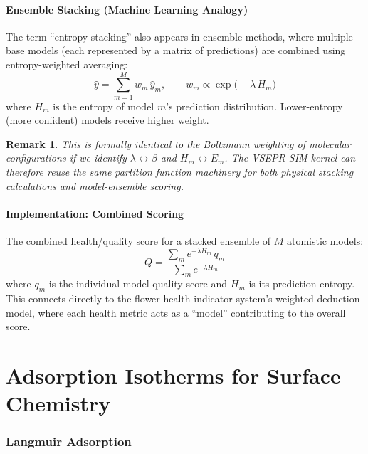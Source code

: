 \documentclass[11pt]{article}
\newtheorem{remark}{Remark}[section]
\begin{document}
\subsection{Ensemble Stacking (Machine Learning Analogy)}

The term ``entropy stacking'' also appears in ensemble methods, where
multiple base models (each represented by a matrix of predictions) are
combined using entropy-weighted averaging:
\begin{equation}
  \hat{y} = \sum_{m=1}^{M} w_m\, \hat{y}_m,
  \qquad
  w_m \propto \exp\!\bigl(-\lambda\, H_m\bigr)
\end{equation}
where $H_m$ is the entropy of model $m$'s prediction distribution.
Lower-entropy (more confident) models receive higher weight.

\begin{remark}
This is formally identical to the Boltzmann weighting of molecular
configurations if we identify $\lambda \leftrightarrow \beta$ and
$H_m \leftrightarrow E_m$.  The VSEPR-SIM kernel can therefore reuse
the same partition function machinery for both physical stacking
calculations and model-ensemble scoring.
\end{remark}

\subsection{Implementation: Combined Scoring}

The combined health/quality score for a stacked ensemble of $M$
atomistic models:
\begin{equation}
  Q = \frac{\sum_{m} e^{-\lambda H_m}\, q_m}
           {\sum_{m} e^{-\lambda H_m}}
\end{equation}
where $q_m$ is the individual model quality score and $H_m$ is its
prediction entropy.  This connects directly to the flower health
indicator system's weighted deduction model, where each health metric
acts as a ``model'' contributing to the overall score.


\part{Adsorption Isotherms for Surface Chemistry}

\section{Langmuir Adsorption}
\end{document}
